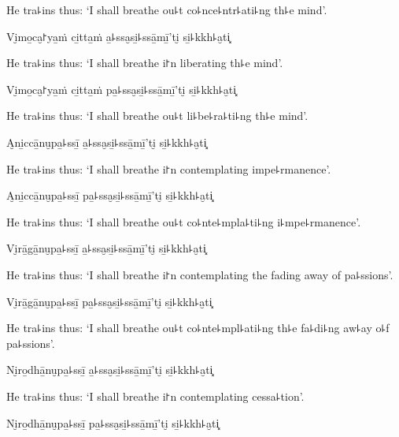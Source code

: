 \begin{english}
  He tra꜕ins thus: `I shall breathe ou꜕t co꜕nce꜕ntr꜕ati꜕ng th꜕e mind'.
\end{english}

Vi̮mo̱ca̮꜓ya̱ṁ ci̱tta̱ṁ a̱꜕ssa̮si̱꜕ssā̱mī̱'ti̮ si̱꜕kkh꜕a̮ti͓

\begin{english}
  He tra꜕ins thus: `I shall breathe i꜓n liberating th꜕e mind'.
\end{english}

Vi̮mo̱ca̮꜓ya̱ṁ ci̱tta̱ṁ pa̱꜕ssa̮si̱꜕ssā̱mī̱'ti̮ si̱꜕kkh꜕a̮ti͓

\begin{english}
  He tra꜕ins thus: `I shall breathe ou꜕t li꜕be꜕ra꜕ti꜕ng th꜕e mind'.
\end{english}

A̮ni̱ccā̱nu̮pa̱꜕ssī̱ a̱꜕ssa̮si̱꜕ssā̱mī̱'ti̮ si̱꜕kkh꜕a̮ti͓

\begin{english}
  He tra꜕ins thus: `I shall breathe i꜓n contemplating impe꜕rmanence'.
\end{english}

A̮ni̱ccā̱nu̮pa̱꜕ssī̱ pa̱꜕ssa̮si̱꜕ssā̱mī̱'ti̮ si̱꜕kkh꜕a̮ti͓

\begin{english}
  He tra꜕ins thus: `I shall breathe ou꜕t co꜕nte꜕mpla꜕ti꜕ng i꜕mpe꜕rmanence'.
\end{english}

Vi̮rā̱gā̱nu̮pa̱꜕ssī̱ a̱꜕ssa̮si̱꜕ssā̱mī̱'ti̮ si̱꜕kkh꜕a̮ti͓

\begin{english}
  He tra꜕ins thus: `I shall breathe i꜓n contemplating the fading away of pa꜕ssions'.
\end{english}

Vi̮rā̱gā̱nu̮pa̱꜕ssī̱ pa̱꜕ssa̮si̱꜕ssā̱mī̱'ti̮ si̱꜕kkh꜕a̮ti͓

\begin{english}
  He tra꜕ins thus: `I shall breathe ou꜕t co꜕nte꜕mpl꜕ati꜕ng th꜕e fa꜕di꜕ng aw꜕ay o꜕f pa꜕ssions'.
\end{english}

Ni̮ro̱dhā̱nu̮pa̱꜕ssī̱ a̱꜕ssa̮si̱꜕ssā̱mī̱'ti̮ si̱꜕kkh꜕a̮ti͓

\begin{english}
  He tra꜕ins thus: `I shall breathe i꜓n contemplating cessa꜕tion'.
\end{english}

Ni̮ro̱dhā̱nu̮pa̱꜕ssī̱ pa̱꜕ssa̮si̱꜕ssā̱mī̱'ti̮ si̱꜕kkh꜕a̮ti͓

